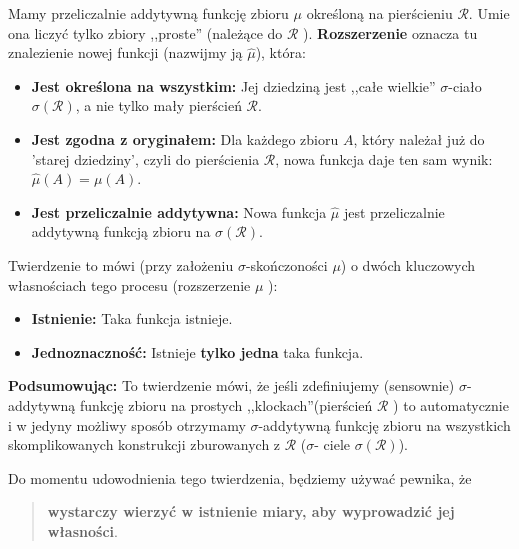 \begin{remark} 
       Mamy przeliczalnie addytywną funkcję zbioru $\mu $ określoną na pierścieniu   $\mathcal{R}$. Umie ona liczyć tylko zbiory ,,proste'' (należące do $\mathcal{R}$ ). \textbf{Rozszerzenie } oznacza tu znalezienie nowej funkcji (nazwijmy ją $\hat{\mu}$), która:
       \begin{itemize}
       	\item \textbf{Jest określona na wszystkim:} Jej dziedziną jest ,,całe wielkie'' $\sigma$-ciało $\sigma\left( \mathcal{R} \right) $, a nie tylko mały pierścień $\mathcal{R}$.
	\item \textbf{Jest zgodna z oryginałem:} Dla każdego zbioru $A$, który należał już do 'starej dziedziny', czyli do pierścienia $\mathcal{R}$, nowa funkcja daje ten sam wynik: $\hat{\mu}\left( A \right) = \mu\left( A \right) $. 
	\item \textbf{Jest przeliczalnie addytywna:} Nowa funkcja $\hat{\mu}$ jest przeliczalnie addytywną funkcją zbioru na $\sigma\left( \mathcal{R} \right) $. 
       \end{itemize}

       Twierdzenie to mówi (przy założeniu $\sigma$-skończoności $\mu$) o dwóch kluczowych własnościach tego procesu (rozszerzenie $\mu$ ):
       \begin{itemize}
       	\item \textbf{Istnienie:} Taka funkcja istnieje.
	\item \textbf{Jednoznaczność: } Istnieje \textbf{tylko jedna} taka funkcja. 
       \end{itemize}

       \textbf{Podsumowując:} To twierdzenie mówi, że jeśli zdefiniujemy (sensownie) $\sigma$-addytywną funkcję zbioru na prostych ,,klockach''(pierścień $\mathcal{R}$ ) to automatycznie i w jedyny możliwy sposób otrzymamy $\sigma$-addytywną funkcję zbioru na wszystkich skomplikowanych konstrukcji zburowanych z $\mathcal{R}$ ($\sigma$- ciele $\sigma\left( \mathcal{R} \right) $).
\end{remark} 

\vspace{1em}

Do momentu udowodnienia tego twierdzenia, będziemy używać pewnika, że 
\begin{quote}
	\textbf{wystarczy wierzyć w istnienie miary, aby wyprowadzić jej własności}.
\end{quote} 

